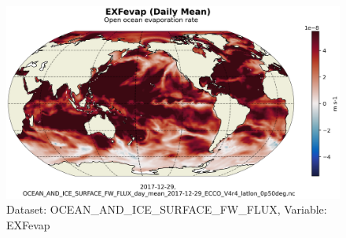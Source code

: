 \begin{figure}[H]
\centering
\includegraphics[scale=0.55]{../images/plots/latlon_plots/Ocean_and_Sea-Ice_Surface_Freshwater_Fluxes/EXFevap.png}
\caption{Dataset: OCEAN\_AND\_ICE\_SURFACE\_FW\_FLUX, Variable: EXFevap}
\label{tab:table-OCEAN_AND_ICE_SURFACE_FW_FLUX_EXFevap-Plot}
\end{figure}
\pagebreak
